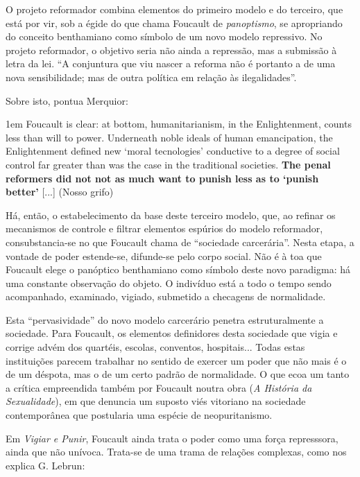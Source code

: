 \documentclass[12pt,a4paper]{article}
\newenvironment{citac}
{
	\begin{addmargin}
		[4cm]{1em} \footnotesize}{\normalfont 
	\end{addmargin}
}
\begin{document}
	O projeto reformador combina elementos do primeiro modelo e do 
	terceiro, que está por vir, sob a égide do que chama Foucault de 
	\textit{panoptismo}, se apropriando do conceito benthamiano como 
	símbolo de um novo modelo repressivo. No projeto reformador, o 
	objetivo seria não ainda a repressão, mas a submissão à letra da 
	lei. ``A conjuntura que viu nascer a reforma não é portanto a de 
	uma nova sensibilidade; mas de outra política em relação às 
	ilegalidades''. %

	\newpage %
	Sobre isto, pontua Merquior: 

	\begin{citac}
		Foucault is clear: at bottom, humanitarianism, in the 
		Enlightenment, counts less than will to power. Underneath 
		noble ideals of human emancipation, the Enlightenment defined 
		new `moral tecnologies' conductive to a degree of social 
		control far greater than was the case in the traditional 
		societies. \textbf{The penal reformers did not not as much 
		want to punish less as to `punish better'} [...] 
		(Nosso grifo) %
	\end{citac}
	
	Há, então, o estabelecimento da base deste terceiro modelo, 
	que, ao refinar os mecanismos de controle e filtrar elementos 
	espúrios do modelo reformador, consubstancia-se no que Foucault 
	chama de ``sociedade carcerária''. Nesta etapa, a vontade de 
	poder estende-se, difunde-se pelo corpo social. Não é à toa que 
	Foucault elege o panóptico benthamiano como símbolo deste novo 
	paradigma: há uma constante observação do objeto. O indivíduo 
	está a todo o tempo sendo acompanhado, examinado, vigiado, 
	submetido a checagens de normalidade. 

	Esta ``pervasividade'' do novo modelo carcerário penetra 
	estruturalmente a sociedade. Para Foucault, os elementos 
	definidores desta sociedade que vigia e corrige advém dos 
	quartéis, escolas, conventos, hospitais... Todas estas 
	instituições parecem trabalhar no sentido de exercer um poder 
	que não mais é o de um déspota, mas o de um certo padrão de 
	normalidade. O que ecoa um tanto a crítica empreendida também 
	por Foucault noutra obra (\textit{A História da Sexualidade}), em que 
	denuncia um suposto viés vitoriano na sociedade contemporânea 
	que postularia uma espécie de neopuritanismo. 

	Em \textit{Vigiar e Punir}, Foucault ainda trata o poder como 
	uma força represssora, ainda que não unívoca. Trata-se de uma 
	trama de relações complexas, como nos explica G. Lebrun: 
\end{document}
